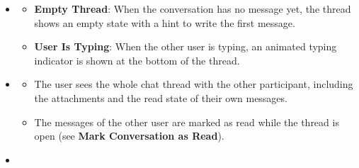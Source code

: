\begin{itemize}[leftmargin=1.6em,topsep=4pt,itemsep=3pt,parsep=0pt,label=$\bullet$]
\begin{itemize}[leftmargin=2.2em,topsep=2pt,itemsep=3pt,parsep=0pt,label=$\circ$]
\begin{itemize}[leftmargin=2.2em,topsep=2pt,itemsep=3pt,parsep=0pt,label=$\blacksquare$]
                    \item A message that contains only emojis is displayed with a larger font.
                \end{itemize}
            \item \textbf{Check the Read State}: Messages that the user has sent show a read indicator.
                \begin{itemize}[leftmargin=2.2em,topsep=2pt,itemsep=3pt,parsep=0pt,label=$\blacksquare$]
                    \item A single check mark means that the message has been delivered but not read.
                    \item A double check mark means that the other user has read the message.
                \end{itemize}
            \item \textbf{Use the Thread Actions}: The user can send a message (see \textbf{Send Message}), attach a file (see \textbf{Send File}) or delete one of their own messages (see \textbf{Delete Message}).
        \end{itemize}
    \item {}

        \begin{itemize}[leftmargin=2.2em,topsep=2pt,itemsep=3pt,parsep=0pt,label=$\circ$]
            \item \textbf{Empty Thread}: When the conversation has no message yet, the thread shows an empty state with a hint to write the first message.
            \item \textbf{User Is Typing}: When the other user is typing, an animated typing indicator is shown at the bottom of the thread.
        \end{itemize}
    \item {}

        \begin{itemize}[leftmargin=2.2em,topsep=2pt,itemsep=3pt,parsep=0pt,label=$\circ$]
            \item The user sees the whole chat thread with the other participant, including the attachments and the read state of their own messages.
            \item The messages of the other user are marked as read while the thread is open (see \textbf{Mark Conversation as Read}).
        \end{itemize}
    \item {}


\end{itemize}
